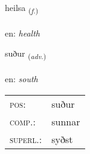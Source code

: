 \documentclass[frontgrid, backgrid]{flacards}\usepackage[]{graphicx}\usepackage[]{color}
\begin{document}
\renewcommand{\flhead}{\vskip5pt \fboxsep=0pt {\small\bfseries\footnotesize Nafnorð | Noun}}
\renewcommand{\fcfoot}{\vskip5pt \fboxsep=0pt \hspace{2pt}{\small\bfseries\footnotesize 2K}}

\renewcommand{\blhead}{\vskip5pt {\small\bfseries\footnotesize Nafnorð | Noun }}
\renewcommand{\bcfoot}{\vskip5pt \hspace{2pt}{\small\bfseries\footnotesize 2K}}


{heilsa \small{\textsubscript{(\textit{f.})}} \\[1ex] %
\textphonetic{[heilsa]} \\
en: \emph{health} \\  [2ex]
\renewcommand*{\arraystretch}{0.8}
}

\renewcommand{\flhead}{\vskip5pt \fboxsep=0pt {\small\bfseries\footnotesize Atviksorð | Adverb}}
\renewcommand{\fcfoot}{\vskip5pt \fboxsep=0pt \hspace{2pt}{\small\bfseries\footnotesize 2K}}

\renewcommand{\blhead}{\vskip5pt {\small\bfseries\footnotesize Atviksorð | Adverb }}
\renewcommand{\bcfoot}{\vskip5pt \hspace{2pt}{\small\bfseries\footnotesize 2K}}


{suður \small{\textsubscript{(\textit{adv.})}} \\[1ex] %
\textphonetic{[sʏːðʏr]} \\
en: \emph{south} \\  [2ex]
\renewcommand*{\arraystretch}{0.8}
\begin{tabular}{ll}
\textsc{pos}: & suður \\ 
\textsc{comp.}: & sunnar \\ 
\textsc{superl.}: & syðst \\
\end{tabular}
}
\end{document}
